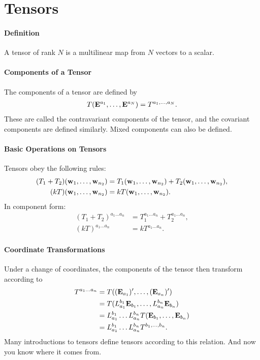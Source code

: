 \section{Tensors}

\paragraph{Definition}
A tensor of rank $N$ is a multilinear map from $N$ vectors to a scalar.

\paragraph{Components of a Tensor}
The components of a tensor are defined by
\begin{align*}
	T(\vb{E}^{a_{1}}, \dots, \vb{E}^{a_{N}}) = T^{a_{1}, \dots, a_{N}}.
\end{align*}
These are called the contravariant components of the tensor, and the covariant components are defined similarly. Mixed components can also be defined.

\paragraph{Basic Operations on Tensors}
Tensors obey the following rules:
\begin{align*}
	(T_{1} + T_{2})(\vb{w}_{1}, \dots, \vb{w}_{n_{2}}) &= T_{1}(\vb{w}_{1}, \dots, \vb{w}_{n_{2}}) + T_{2}(\vb{w}_{1}, \dots, \vb{w}_{n_{2}}), \\
	(kT)(\vb{w}_{1}, \dots, \vb{w}_{n_{2}})            &= kT(\vb{w}_{1}, \dots, \vb{w}_{n_{2}}).
\end{align*}
In component form:
\begin{align*}
	(T_{1} + T_{2})^{a_{1}\dots a_{n}} &= T_{1}^{a_{1}\dots a_{n}} + T_{2}^{a_{1}\dots a_{n}}, \\
	(kT)^{a_{1}\dots a_{n}}            &= kT^{a_{1}\dots a_{n}}.
\end{align*}

\paragraph{Coordinate Transformations}
Under a change of coordinates, the components of the tensor then transform according to
\begin{align*}
	T^{a_{1}\dots a_{n}} &= T((\vb{E}_{a_{1}})', \dots, (\vb{E}_{a_{n}})') \\
	                     &= T(L_{a_{1}}^{b_{1}}\vb{E}_{b_{1}}, \dots, L_{a_{n}}^{b_{n}}\vb{E}_{b_{n}}) \\
	                     &= L_{a_{1}}^{b_{1}}\dots L_{a_{n}}^{b_{n}}T(\vb{E}_{b_{1}}, \dots, \vb{E}_{b_{n}}) \\
	                     &= L_{a_{1}}^{b_{1}}\dots L_{a_{n}}^{b_{n}}T^{b_{1}, \dots, b_{n}}.
\end{align*}
Many introductions to tensors define tensors according to this relation. And now you know where it comes from.

